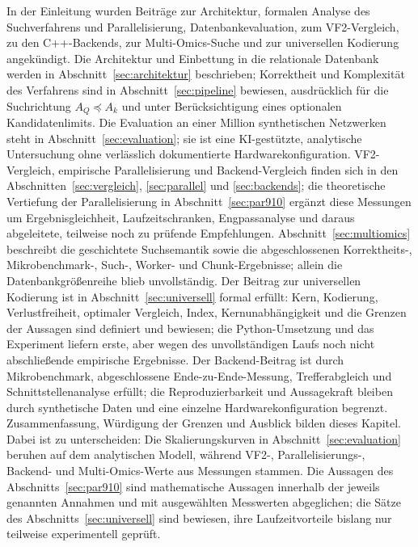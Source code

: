 \documentclass[a4paper,12pt, twoside]{report}
\theoremstyle{definition}
\begin{document}
In der Einleitung wurden Beiträge zur Architektur, formalen Analyse des Suchverfahrens und Parallelisierung, Datenbankevaluation, zum VF2-Vergleich, zu den C++-Backends, zur Multi-Omics-Suche und zur universellen Kodierung angekündigt. Die Architektur und Einbettung in die relationale Datenbank werden in Abschnitt~\ref{sec:architektur} beschrieben; Korrektheit und Komplexität des Verfahrens sind in Abschnitt~\ref{sec:pipeline} bewiesen, ausdrücklich für die Suchrichtung $A_Q \preceq A_k$ und unter Berücksichtigung eines optionalen Kandidatenlimits. Die Evaluation an einer Million synthetischen Netzwerken steht in Abschnitt~\ref{sec:evaluation}; sie ist eine KI-gestützte, analytische Untersuchung ohne verlässlich dokumentierte Hardwarekonfiguration. VF2-Vergleich, empirische Parallelisierung und Backend-Vergleich finden sich in den Abschnitten~\ref{sec:vergleich}, \ref{sec:parallel} und \ref{sec:backends}; die theoretische Vertiefung der Parallelisierung in Abschnitt~\ref{sec:par910} ergänzt diese Messungen um Ergebnisgleichheit, Laufzeitschranken, Engpassanalyse und daraus abgeleitete, teilweise noch zu prüfende Empfehlungen. Abschnitt~\ref{sec:multiomics} beschreibt die geschichtete Suchsemantik sowie die abgeschlossenen Korrektheits-, Mikrobenchmark-, Such-, Worker- und Chunk-Ergebnisse; allein die Datenbankgrößenreihe blieb unvollständig. Der Beitrag zur universellen Kodierung ist in Abschnitt~\ref{sec:universell} formal erfüllt: Kern, Kodierung, Verlustfreiheit, optimaler Vergleich, Index, Kernunabhängigkeit und die Grenzen der Aussagen sind definiert und bewiesen; die Python-Umsetzung und das Experiment liefern erste, aber wegen des unvollständigen Laufs noch nicht abschließende empirische Ergebnisse. Der Backend-Beitrag ist durch Mikrobenchmark, abgeschlossene Ende-zu-Ende-Messung, Trefferabgleich und Schnittstellenanalyse erfüllt; die Reproduzierbarkeit und Aussagekraft bleiben durch synthetische Daten und eine einzelne Hardwarekonfiguration begrenzt. Zusammenfassung, Würdigung der Grenzen und Ausblick bilden dieses Kapitel. Dabei ist zu unterscheiden: Die Skalierungskurven in Abschnitt~\ref{sec:evaluation} beruhen auf dem analytischen Modell, während VF2-, Parallelisierungs-, Backend- und Multi-Omics-Werte aus Messungen stammen. Die Aussagen des Abschnitts~\ref{sec:par910} sind mathematische Aussagen innerhalb der jeweils genannten Annahmen und mit ausgewählten Messwerten abgeglichen; die Sätze des Abschnitts~\ref{sec:universell} sind bewiesen, ihre Laufzeitvorteile bislang nur teilweise experimentell geprüft.
\end{document}
